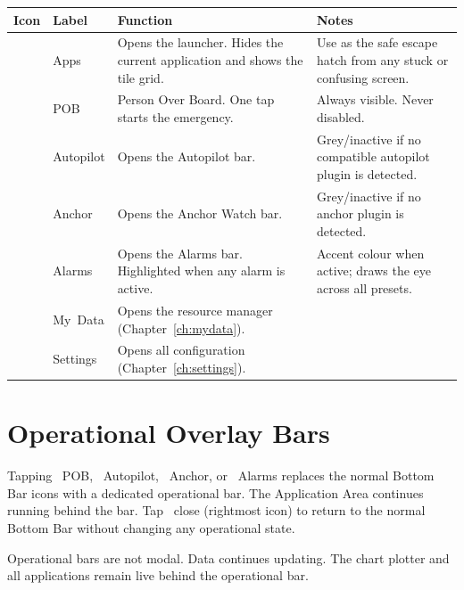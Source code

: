 \begin{longtable}{C{1.4cm}L{2.4cm}L{5.4cm}L{4.5cm}}
\toprule
{}
\color{white}\sffamily\bfseries Icon &
\color{white}\sffamily\bfseries Label &
\color{white}\sffamily\bfseries Function &
\color{white}\sffamily\bfseries Notes \\
\midrule
{}     & Apps      &
  Opens the launcher. Hides the current application and shows the tile grid. &
  Use as the safe escape hatch from any stuck or confusing screen. \\
        & POB       &
  Person Over Board. One tap starts the emergency. &
  Always visible. Never disabled. \\
& Autopilot &
  Opens the Autopilot bar. &
  Grey/inactive if no compatible autopilot plugin is detected. \\
       & Anchor    &
  Opens the Anchor Watch bar. &
  Grey/inactive if no anchor plugin is detected. \\
    & Alarms    &
  Opens the Alarms bar. Highlighted when any alarm is active. &
  Accent colour when active; draws the eye across all presets. \\
         & My~Data   &
  Opens the resource manager (Chapter~\ref{ch:mydata}). & \\
     & Settings  &
  Opens all configuration (Chapter~\ref{ch:settings}). & \\
\bottomrule
\end{longtable}

\section{Operational Overlay Bars}

Tapping ~POB, ~Autopilot,
~Anchor, or ~Alarms replaces the normal Bottom
Bar icons with a dedicated operational bar.
The Application Area continues running behind the bar.
Tap ~close (rightmost icon) to return to the normal Bottom Bar
without changing any operational state.

\begin{warningbox}
Operational bars are not modal.
Data continues updating.
The chart plotter and all applications remain live behind the operational bar.
\end{warningbox}

